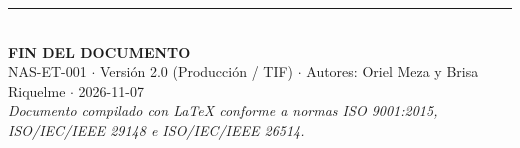 \documentclass[10pt,a4paper]{article}
\begin{document}
\vspace{1.5cm}
\begin{center}
\rule{0.6\textwidth}{0.5pt}\\[0.3cm]
\textbf{\sffamily\color{primaryblue}FIN DEL DOCUMENTO}\\[0.1cm]
\textsf{NAS-ET-001 $\cdot$ Versión 2.0 (Producción / TIF) $\cdot$ Autores: Oriel Meza y Brisa Riquelme $\cdot$ 2026-11-07}\\[0.2cm]
{\footnotesize\textit{Documento compilado con \LaTeX{} conforme a normas ISO 9001:2015, ISO/IEC/IEEE 29148 e ISO/IEC/IEEE 26514.}}
\end{center}
\end{document}
